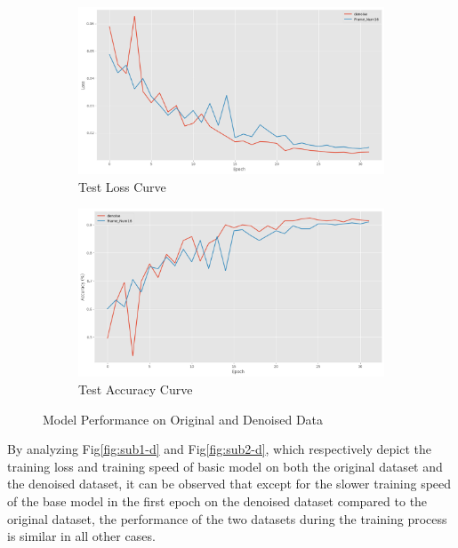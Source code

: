 \documentclass[conference]{IEEEtran}
\begin{document}
\begin{figure}[htbp]
    \begin{subfigure}[b]{0.24\textwidth}
        \centering
        \includegraphics[width=\textwidth]{figure/denoise_test_loss.png}
        \caption{Test Loss Curve}
        \label{fig:sub3-d}
    \end{subfigure}
    \begin{subfigure}[b]{0.24\textwidth}
        \centering
        \includegraphics[width=\textwidth]{figure/denoise_test_acc.png}
        \caption{Test Accuracy Curve}
        \label{fig:sub4-d}
    \end{subfigure}
    \caption{Model Performance on Original and Denoised Data}
    \label{fig:performance-denoise}
\end{figure}

By analyzing Fig\ref{fig:sub1-d} and Fig\ref{fig:sub2-d}, which respectively depict the training loss and training speed of basic model on both the original dataset and the denoised dataset, it can be observed that except for the slower training speed of the base model in the first epoch on the denoised dataset compared to the original dataset, the performance of the two datasets during the training process is similar in all other cases. 
\end{document}
